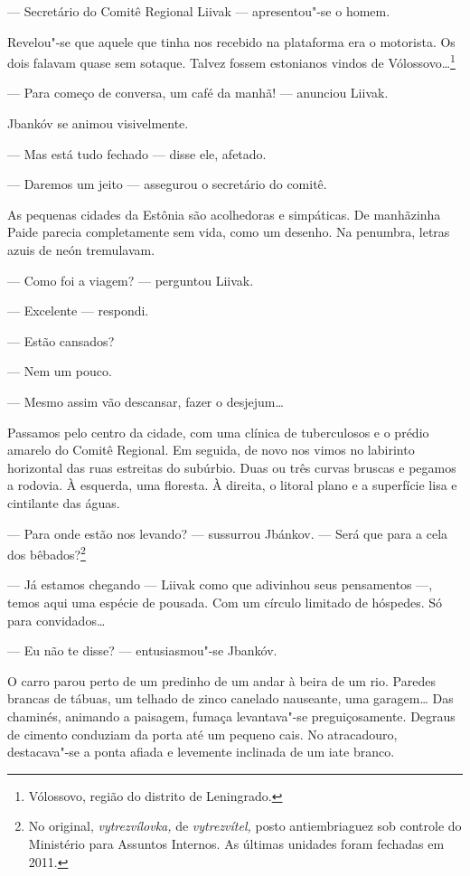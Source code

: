 --- Secretário do Comitê Regional Liivak --- apresentou"-se
o homem.

Revelou"-se que aquele que tinha nos recebido na plataforma era o
motorista. Os dois falavam quase sem sotaque. Talvez fossem estonianos
vindos de Vólossovo\ldots{}\footnote{Vólossovo, região do distrito de
  Leningrado.}

--- Para começo de conversa, um café da manhã! ---
anunciou Liivak.

Jbankóv se animou visivelmente.

--- Mas está tudo fechado --- disse ele, afetado.

--- Daremos um jeito --- assegurou o secretário do comitê.

As pequenas cidades da Estônia são acolhedoras e simpáticas. De
manhãzinha Paide parecia completamente sem vida, como um desenho. Na
penumbra, letras azuis de neón tremulavam.

--- Como foi a viagem? --- perguntou Liivak.

--- Excelente --- respondi.

--- Estão cansados?

--- Nem um pouco.

--- Mesmo assim vão descansar, fazer o desjejum\ldots{}

Passamos pelo centro da cidade, com uma clínica de tuberculosos e o
prédio amarelo do Comitê Regional. Em seguida, de novo nos vimos no
labirinto horizontal das ruas estreitas do subúrbio. Duas ou três curvas
bruscas e pegamos a rodovia. À esquerda, uma floresta. À direita, o
litoral plano e a superfície lisa e cintilante das águas.

--- Para onde estão nos levando? --- sussurrou Jbánkov.
--- Será que para a cela dos bêbados?\footnote{No original,
  \emph{vytrezvílovka,} de \emph{vytrezvítel,} posto antiembriaguez sob
  controle do Ministério para Assuntos Internos. As últimas unidades
  foram fechadas em 2011.}

--- Já estamos chegando --- Liivak como que adivinhou seus
pensamentos ---, temos aqui uma espécie de pousada. Com um
círculo limitado de hóspedes. Só para convidados\ldots{}

--- Eu não te disse? --- entusiasmou"-se Jbankóv.

O carro parou perto de um predinho de um andar à beira de um rio.
Paredes brancas de tábuas, um telhado de zinco canelado nauseante, uma garagem\ldots{}
Das chaminés, animando a paisagem, fumaça levantava"-se preguiçosamente.
Degraus de cimento conduziam da porta até um pequeno cais. No
atracadouro, destacava"-se a ponta afiada e levemente inclinada de um
iate branco.

